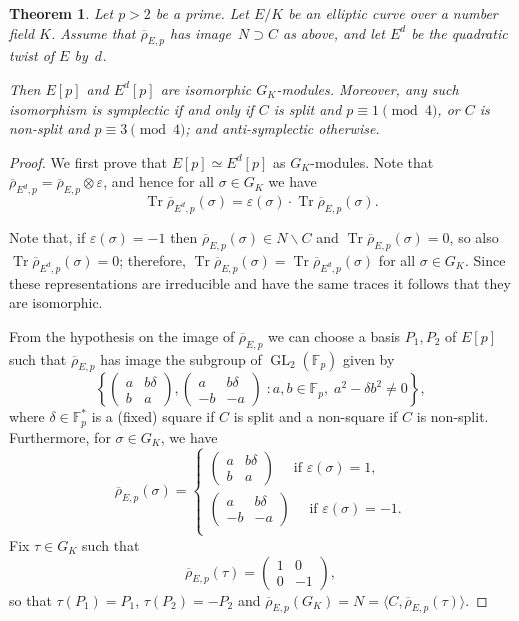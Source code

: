 \documentclass[12pt]{amsart}
\newcommand{\F}{\mathbb{F}}
\newcommand{\rhobar}{{\overline{\rho}}}
\newcommand{\eps}{\varepsilon}
\DeclareMathOperator{\Tr}{Tr}
\newcommand{\GL}{\operatorname{GL}}
\numberwithin{equation}{section}
\newtheorem{theorem}{Theorem}[section]
\theoremstyle{definition}
\theoremstyle{remark}
\begin{document}
\begin{theorem} Let $p > 2$ be a prime. Let $E/K$ be an elliptic curve 
over a number field $K$. Assume that $\rhobar_{E,p}$ has image~$N
\supset C$ as above, and let $E^d$ be the quadratic twist of $E$
by~$d$.

Then $E[p]$ and $E^d[p]$ are isomorphic $G_K$-modules. Moreover, any
such isomorphism is symplectic if and only if $C$ is split and $p
\equiv 1 \pmod{4}$, or $C$ is non-split and $p \equiv 3 \pmod{4}$; and
anti-symplectic otherwise.
\end{theorem}

\begin{proof} We first prove that $E[p] \simeq E^d[p]$ as $G_K$-modules. 
Note that $\rhobar_{{E^d}, p} = \rhobar_{E, p} \otimes \eps$, and
hence for all $\sigma \in G_K$ we have
\[\Tr \rhobar_{{E^d},p}(\sigma) = \eps(\sigma) \cdot \Tr \rhobar_{E,p}(\sigma).\]

Note that, if $\eps(\sigma) = -1$ then $\rhobar_{E,p}(\sigma) \in N\backslash C$ and $\Tr \rhobar_{E,p}(\sigma) = 0$, so also $\Tr \rhobar_{E^d,p}(\sigma) = 0$;
therefore, $\Tr \rhobar_{E,p}(\sigma) = \Tr \rhobar_{E^d,p}(\sigma)$ 
for all $\sigma \in G_K$. Since these representations are irreducible and have
the same traces it follows that they are isomorphic.

From the hypothesis on the image of $\rhobar_{E,p}$ we can 
choose a basis $P_1, P_2$ of $E[p]$ such that $\rhobar_{E,p}$ has image 
the subgroup of $\GL_2(\F_p)$ given by 
\[
\left\{ 
\begin{pmatrix}
a & b\delta \\
b & a
\end{pmatrix}, 
\begin{pmatrix}
a & b\delta \\
-b & -a
\end{pmatrix}  \; : a, b \in \F_p, \; a^2 - \delta b^2 \neq 0 \right\},
\]
where $\delta \in \F_p^*$ is a (fixed) square if $C$ is split and a
non-square if $C$ is non-split. Furthermore, for $\sigma \in G_K$, we
have
\[
 \rhobar_{E,p}(\sigma) = \begin{cases} 
                            \begin{pmatrix}
                            a & b\delta \\
                            b & a
                            \end{pmatrix} \quad \text{ if } \eps(\sigma) = 1,  \\
\begin{pmatrix}
a & b\delta \\
-b & -a
\end{pmatrix} \quad \text{ if } \eps(\sigma) = -1.  \\
\end{cases}\]
Fix $\tau \in G_K$ such that 
\[
 \rhobar_{E,p}(\tau) =  \begin{pmatrix}
                            1 & 0 \\
                            0 & -1
                            \end{pmatrix},
\]
so that  $\tau(P_1) = P_1$, $\tau(P_2) = -P_2$ and 
$\rhobar_{E,p}(G_K) = N = \langle C,\rhobar_{E,p}(\tau) \rangle$.



\end{proof}
\end{document}
